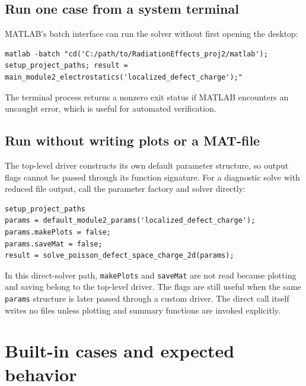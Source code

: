 \documentclass[11pt]{article}
\begin{document}
\subsection{Run one case from a system terminal}

MATLAB's batch interface can run the solver without first opening the desktop:
\begin{lstlisting}[style=projectshell]
matlab -batch "cd('C:/path/to/RadiationEffects_proj2/matlab'); setup_project_paths; result = main_module2_electrostatics('localized_defect_charge');"
\end{lstlisting}
The terminal process returns a nonzero exit status if MATLAB encounters an uncaught error, which is useful for automated verification.

\subsection{Run without writing plots or a MAT-file}

The top-level driver constructs its own default parameter structure, so output flags cannot be passed through its function signature. For a diagnostic solve with reduced file output, call the parameter factory and solver directly:
\begin{lstlisting}[style=projectmatlab]
setup_project_paths
params = default_module2_params('localized_defect_charge');
params.makePlots = false;
params.saveMat = false;
result = solve_poisson_defect_space_charge_2d(params);
\end{lstlisting}
In this direct-solver path, \texttt{makePlots} and \texttt{saveMat} are not read because plotting and saving belong to the top-level driver. The flags are still useful when the same \texttt{params} structure is later passed through a custom driver. The direct call itself writes no files unless plotting and summary functions are invoked explicitly.

\section{Built-in cases and expected behavior}
\end{document}
